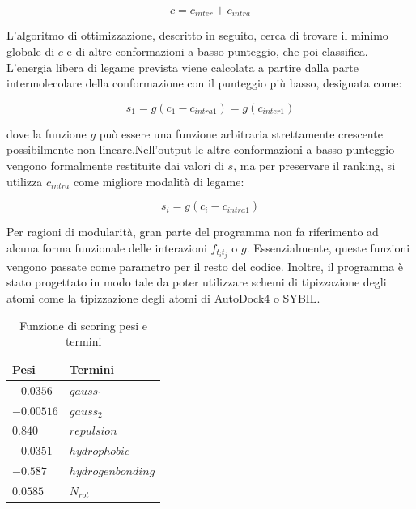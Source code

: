 \begin{equation}
    c = c_{inter} + c_{intra}
\end{equation}

L'algoritmo di ottimizzazione, descritto in seguito, cerca di trovare il minimo globale di $c$ e di altre conformazioni a basso punteggio, che poi classifica.\newline 
L'energia libera di legame prevista viene calcolata a partire dalla parte intermolecolare della conformazione con il punteggio più basso, designata come:

\begin{equation}
    s_1 = g(c_1 - c_{intra1}) = g(c_{inter1})
\end{equation}

dove la funzione $g$ può essere una funzione arbitraria strettamente crescente possibilmente non lineare.\newline Nell'output le altre conformazioni a basso punteggio vengono formalmente restituite dai valori di $s$, ma per preservare il ranking, si utilizza $c_{intra}$ come migliore modalità di legame:

\begin{equation}
    s_i = g(c_i - c_{intra1})
\end{equation}

Per ragioni di modularità, gran parte del programma non fa riferimento ad alcuna forma funzionale delle interazioni $f_{t_it_j}$ o $g$. Essenzialmente, queste funzioni vengono passate come parametro per il resto del codice. Inoltre, il programma è stato progettato in modo tale da poter utilizzare schemi di tipizzazione degli atomi come la tipizzazione degli atomi di AutoDock4 o SYBIL.\newline

\begin{table}[H]
    \centering
    \begin{tabular}{|l|l|}
        \hline
        \textbf{Pesi} & \textbf{Termini}\\
        \hline
        $-0.0356$ & $gauss_1$\\
        $-0.00516$ & $gauss_2$\\
        $0.840$ & $repulsion$\\
        $-0.0351$ & $hydrophobic$\\
        $-0.587$ & $hydrogen bonding$\\
        $0.0585$ & $N_{rot}$\\
        \hline
    \end{tabular}
    \caption{Funzione di scoring pesi e termini}
    \label{tab:Tabella Pesi e Termini}
\end{table}

